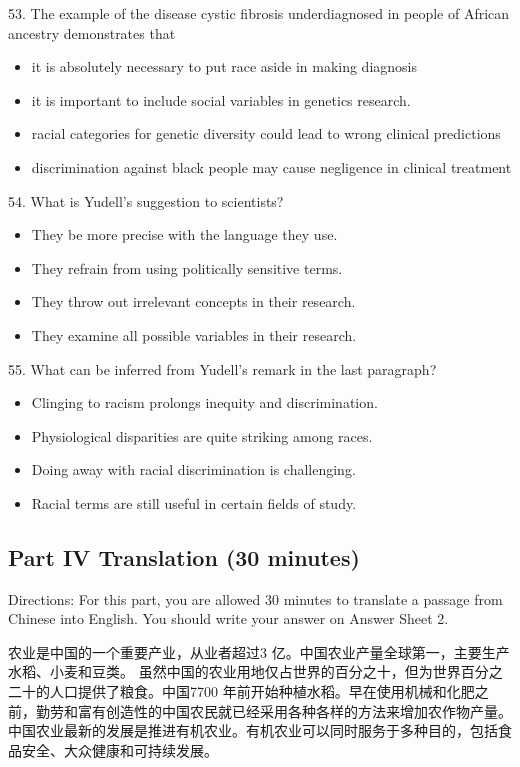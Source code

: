 \documentclass[UTF8,11pt]{ctexart}
\begin{document}
53. The example of the disease cystic fibrosis underdiagnosed in people of African ancestry demonstrates that


\begin{itemize}[leftmargin=2em,itemsep=.2em,topsep=.4em]\item[A.] it is absolutely necessary to put race aside in making diagnosis
\item[B.] it is important to include social variables in genetics research.
\item[C.] racial categories for genetic diversity could lead to wrong clinical predictions
\item[D.] discrimination against black people may cause negligence in clinical treatment
\end{itemize}

54. What is Yudell’s suggestion to scientists?


\begin{itemize}[leftmargin=2em,itemsep=.2em,topsep=.4em]\item[A.] They be more precise with the language they use.
\item[B.] They refrain from using politically sensitive terms.
\item[C.] They throw out irrelevant concepts in their research.
\item[D.] They examine all possible variables in their research.
\end{itemize}

55. What can be inferred from Yudell’s remark in the last paragraph?


\begin{itemize}[leftmargin=2em,itemsep=.2em,topsep=.4em]\item[A.] Clinging to racism prolongs inequity and discrimination.
\item[B.] Physiological disparities are quite striking among races.
\item[C.] Doing away with racial discrimination is challenging.
\item[D.] Racial terms are still useful in certain fields of study.
\end{itemize}

\subsection*{\textbf{Part IV Translation (30 minutes)}}


Directions: For this part, you are allowed 30 minutes to translate a passage from Chinese into English. You should write your answer on Answer Sheet 2.


农业是中国的一个重要产业，从业者超过3 亿。中国农业产量全球第一，主要生产水稻、小麦和豆类。 虽然中国的农业用地仅占世界的百分之十，但为世界百分之二十的人口提供了粮食。中国7700 年前开始种植水稻。早在使用机械和化肥之前，勤劳和富有创造性的中国农民就已经采用各种各样的方法来增加农作物产量。中国农业最新的发展是推进有机农业。有机农业可以同时服务于多种目的，包括食品安全、大众健康和可持续发展。
\end{document}

